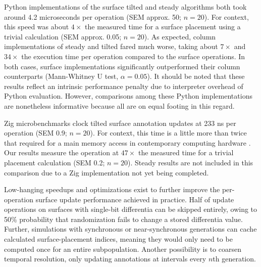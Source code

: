 Python implementations of the surface tilted and steady algorithms both took around 4.2 microseconds per operation (SEM approx. 50; $n=20$).
For context, this speed was about $4\times$ the measured time for a surface placement using a trivial calculation (SEM approx. 0.05; $n=20$).
As expected, column implementations of steady and tilted fared much worse, taking about $7\times$ and $34\times$ the execution time per operation compared to the surface operations.
In both cases, surface implementations significantly outperformed their column counterparts (Mann-Whitney U test, $\alpha = 0.05$).
It should be noted that these results reflect an intrinsic performance penalty due to interpreter overhead of Python evaluation.
However, comparisons among these Python implementations are nonetheless informative because all are on equal footing in this regard.

Zig microbenchmarks clock tilted surface annotation updates at 233 ns per operation (SEM 0.9; $n=20$).
For context, this time is a little more than twice that required for a main memory access in contemporary computing hardware \citep{markus2022memory}.
Our results measure the operation at $47\times$ the measured time for a trivial placement calculation (SEM 0.2; $n=20$).
Steady results are not included in this comparison due to a Zig implementation not yet being completed.

Low-hanging speedups and optimizations exist to further improve the per-operation surface update performance achieved in practice.
Half of update operations on surfaces with single-bit differentia can be skipped entirely, owing to 50\% probability that randomization fails to change a stored differentia value.
Further, simulations with synchronous or near-synchronous generations can cache calculated surface-placement indices, meaning they would only need to be computed once for an entire subpopulation.
Another possibility is to coarsen temporal resolution, only updating annotations at intervals every $n$th generation.

